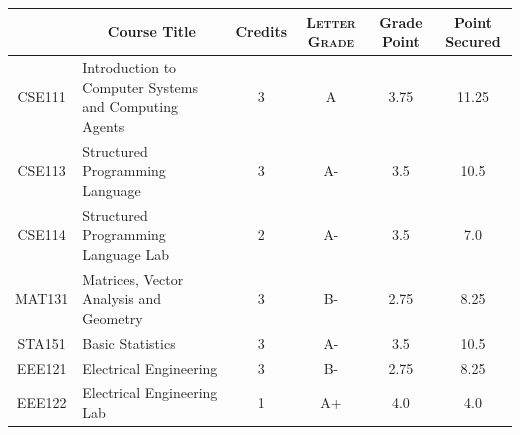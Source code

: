 \documentclass[11pt]{article}
\newcommand*{\numtwo}[1]{\pgfmathprintnumber[
                    fixed, precision=2, fixed zerofill=true]{#1}}
\begin{document}
                \begin{center}
                    \renewcommand{\arraystretch}{1.08}
                    
                \begin{tabular}{|c|l|c|>{\scshape}c|c|c|}
                \hline  \rule[-1ex]{0pt}{3.5ex} {\centering{\bf Course Code}} &  \multicolumn{1}{c|}{\textbf{Course Title}}  & {\bf Credits} & {\bf Letter Grade} & {\bf Grade Point} & {\bf Point Secured}  \\ 
                \hline   CSE111 &  Introduction to Computer Systems and Computing Agents		 & 3 & A & 3.75 & 11.25 \\ %
                \hline   CSE113 &  Structured Programming Language		 & 3 & A- & 3.5 & 10.5 \\ %
                \hline   CSE114 &  Structured Programming Language Lab		 & 2 & A- & 3.5 & 7.0 \\ %
                \hline   MAT131 &  Matrices, Vector Analysis and Geometry		 & 3 & B- & 2.75 & 8.25 \\ %
                \hline   STA151 &  Basic Statistics		 & 3 & A- & 3.5 & 10.5 \\ %
                \hline   EEE121 &  Electrical Engineering		 & 3 & B- & 2.75 & 8.25 \\ %
                \hline   EEE122 &  Electrical Engineering Lab		 & 1 & A+ & 4.0 & 4.0 \\ %

\hline                %
                \end{tabular}
                \end{center}
                \renewcommand{\arraystretch}{1.03}
\end{document}
